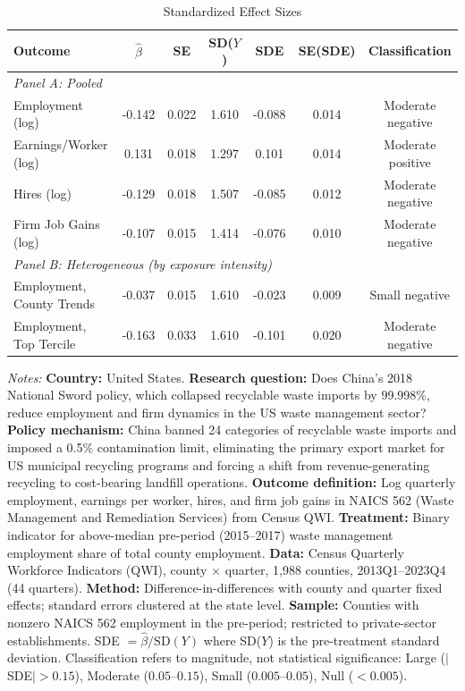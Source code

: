 \begin{table}[t]
\centering
\caption{Standardized Effect Sizes}
\label{tab:sde}
\begin{threeparttable}
\small
\begin{tabular}{lcccccc}
\hline\hline
Outcome & $\hat{\beta}$ & SE & SD($Y$) & SDE & SE(SDE) & Classification \\
\hline
\multicolumn{7}{l}{\textit{Panel A: Pooled}} \\
\hline
Employment (log) & -0.142 & 0.022 & 1.610 & -0.088 & 0.014 & Moderate negative \\
Earnings/Worker (log) & 0.131 & 0.018 & 1.297 & 0.101 & 0.014 & Moderate positive \\
Hires (log) & -0.129 & 0.018 & 1.507 & -0.085 & 0.012 & Moderate negative \\
Firm Job Gains (log) & -0.107 & 0.015 & 1.414 & -0.076 & 0.010 & Moderate negative \\
\hline
\multicolumn{7}{l}{\textit{Panel B: Heterogeneous (by exposure intensity)}} \\
\hline
Employment, County Trends & -0.037 & 0.015 & 1.610 & -0.023 & 0.009 & Small negative \\
Employment, Top Tercile & -0.163 & 0.033 & 1.610 & -0.101 & 0.020 & Moderate negative \\
\hline\hline
\end{tabular}
\begin{tablenotes}
\item \textit{Notes:} \textbf{Country:} United States. \textbf{Research question:} Does China's 2018 National Sword policy, which collapsed recyclable waste imports by 99.998\%, reduce employment and firm dynamics in the US waste management sector? \textbf{Policy mechanism:} China banned 24 categories of recyclable waste imports and imposed a 0.5\% contamination limit, eliminating the primary export market for US municipal recycling programs and forcing a shift from revenue-generating recycling to cost-bearing landfill operations. \textbf{Outcome definition:} Log quarterly employment, earnings per worker, hires, and firm job gains in NAICS 562 (Waste Management and Remediation Services) from Census QWI. \textbf{Treatment:} Binary indicator for above-median pre-period (2015--2017) waste management employment share of total county employment. \textbf{Data:} Census Quarterly Workforce Indicators (QWI), county $\times$ quarter, 1,988 counties, 2013Q1--2023Q4 (44 quarters). \textbf{Method:} Difference-in-differences with county and quarter fixed effects; standard errors clustered at the state level. \textbf{Sample:} Counties with nonzero NAICS 562 employment in the pre-period; restricted to private-sector establishments. SDE $= \hat{\beta} / \text{SD}(Y)$ where SD($Y$) is the pre-treatment standard deviation. Classification refers to magnitude, not statistical significance: Large ($|$SDE$| > 0.15$), Moderate ($0.05$--$0.15$), Small ($0.005$--$0.05$), Null ($< 0.005$).
\end{tablenotes}
\end{threeparttable}
\end{table}
